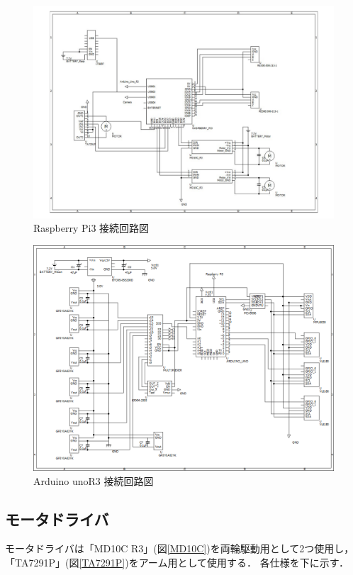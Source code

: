 \documentclass[10pt,a4j]{ujarticle}
\begin{document}
\newpage
\begin{figure}[h]
 \centering
 \includegraphics[clip,scale=0.35]{./picture/RCR_raspberryPi3.pdf}
    \caption{Raspberry Pi3 接続回路図}
    \label{c_raspberry}
\end{figure}

\begin{figure}[h]
 \centering
 \includegraphics[clip,scale=0.35]{./picture/RCR_arduino_02.png}
    \caption{Arduino unoR3 接続回路図}
    \label{c_arduino}
\end{figure}
\newpage

\newpage
\subsection{モータドライバ}
モータドライバは「MD10C R3」(図\ref{MD10C})を両輪駆動用として2つ使用し，
「TA7291P」(図\ref{TA7291P})をアーム用として使用する．
各仕様を下に示す．
\end{document}
